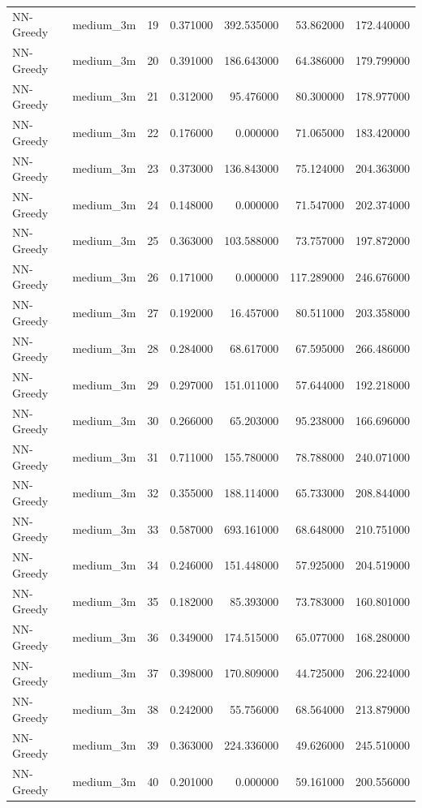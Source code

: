 \begin{tabular}{llrrrrr}
NN-Greedy & medium_3m & 19 & 0.371000 & 392.535000 & 53.862000 & 172.440000 \\
NN-Greedy & medium_3m & 20 & 0.391000 & 186.643000 & 64.386000 & 179.799000 \\
NN-Greedy & medium_3m & 21 & 0.312000 & 95.476000 & 80.300000 & 178.977000 \\
NN-Greedy & medium_3m & 22 & 0.176000 & 0.000000 & 71.065000 & 183.420000 \\
NN-Greedy & medium_3m & 23 & 0.373000 & 136.843000 & 75.124000 & 204.363000 \\
NN-Greedy & medium_3m & 24 & 0.148000 & 0.000000 & 71.547000 & 202.374000 \\
NN-Greedy & medium_3m & 25 & 0.363000 & 103.588000 & 73.757000 & 197.872000 \\
NN-Greedy & medium_3m & 26 & 0.171000 & 0.000000 & 117.289000 & 246.676000 \\
NN-Greedy & medium_3m & 27 & 0.192000 & 16.457000 & 80.511000 & 203.358000 \\
NN-Greedy & medium_3m & 28 & 0.284000 & 68.617000 & 67.595000 & 266.486000 \\
NN-Greedy & medium_3m & 29 & 0.297000 & 151.011000 & 57.644000 & 192.218000 \\
NN-Greedy & medium_3m & 30 & 0.266000 & 65.203000 & 95.238000 & 166.696000 \\
NN-Greedy & medium_3m & 31 & 0.711000 & 155.780000 & 78.788000 & 240.071000 \\
NN-Greedy & medium_3m & 32 & 0.355000 & 188.114000 & 65.733000 & 208.844000 \\
NN-Greedy & medium_3m & 33 & 0.587000 & 693.161000 & 68.648000 & 210.751000 \\
NN-Greedy & medium_3m & 34 & 0.246000 & 151.448000 & 57.925000 & 204.519000 \\
NN-Greedy & medium_3m & 35 & 0.182000 & 85.393000 & 73.783000 & 160.801000 \\
NN-Greedy & medium_3m & 36 & 0.349000 & 174.515000 & 65.077000 & 168.280000 \\
NN-Greedy & medium_3m & 37 & 0.398000 & 170.809000 & 44.725000 & 206.224000 \\
NN-Greedy & medium_3m & 38 & 0.242000 & 55.756000 & 68.564000 & 213.879000 \\
NN-Greedy & medium_3m & 39 & 0.363000 & 224.336000 & 49.626000 & 245.510000 \\
NN-Greedy & medium_3m & 40 & 0.201000 & 0.000000 & 59.161000 & 200.556000 \\

\end{tabular}
